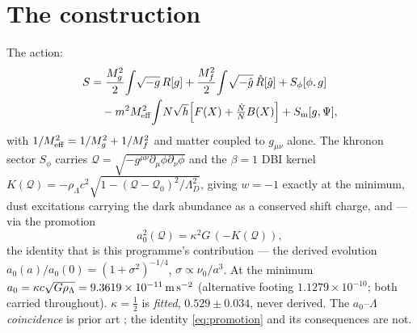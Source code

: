 \documentclass[aps,prd,twocolumn,10pt,nofootinbib,superscriptaddress]{revtex4-2}
\newcommand{\QQ}{\mathcal{Q}}
\begin{document}
\begin{abstract}
functions of the same phase-space scalar), collapsing $\{C,\hat C\}$ to two cross terms; and on
an explicit lattice representative, with every constraint imposed at every site and both
controls passing exactly, the on-shell bracket is \emph{nonzero} at a generic real point.
First-classness is universal, so the ghost-propagating alternative is refuted on the
representative: the pair is second class and the Boulware--Deser mode is removed there.
\textbf{Not claimed:} closure. The exact kinetic reduction, the continuum statement, and full
Dirac consistency remain, and are listed. Every prior error made in this programme --- six,
roughly half manufactured deficits and half manufactured wins --- is recorded, dated, with
directions stated, in the repository's retraction log.
\end{abstract}

\maketitle

\section{The construction}

The action:
\begin{align}
S&=\frac{M_g^2}{2}\!\int\!\sqrt{-g}\,R[g]+\frac{M_f^2}{2}\!\int\!\sqrt{-\hat g}\,\hat R[\hat g]
+S_\phi[\phi,g]\nonumber\\
&\quad-m^2M_{\rm eff}^2\!\int\! N\sqrt{h}\Big[F(X)+\tfrac{\hat N}{N}B(X)\Big]+S_{\rm m}[g,\Psi],
\label{eq:action}
\end{align}
with $1/M_{\rm eff}^2=1/M_g^2+1/M_f^2$ and matter coupled to $g_{\mu\nu}$ alone. The khronon
sector $S_\phi$ carries $\QQ=\sqrt{-g^{\mu\nu}\partial_\mu\phi\partial_\nu\phi}$ and the
$\beta=1$ DBI kernel $K(\QQ)=-\rho_\Lambda c^2\sqrt{1-(\QQ-\QQ_0)^2/\Lambda_D^2}$, giving
$w=-1$ exactly at the minimum, dust excitations carrying the dark abundance as a conserved
shift charge, and --- via the promotion
\begin{equation}
a_0^2(\QQ)=\kappa^2G\,(-K(\QQ)),
\label{eq:promotion}
\end{equation}
the identity that is this programme's contribution --- the derived evolution
$a_0(a)/a_0(0)=(1+\sigma^2)^{-1/4}$, $\sigma\propto\nu_0/a^3$. At the minimum
$a_0=\kappa c\sqrt{G\rho_\Lambda}=9.3619\times10^{-11}\,{\rm m\,s^{-2}}$ (alternative footing
$1.1279\times10^{-10}$; both carried throughout). $\kappa=\tfrac12$ is \emph{fitted},
$0.529\pm0.034$, never derived. The $a_0$--$\Lambda$ \emph{coincidence} is prior art
\cite{M99,BLT,Pik,KK}; the identity \eqref{eq:promotion} and its consequences are not.
\end{document}
